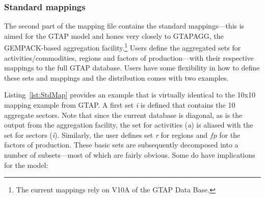 \subsubsection{Standard mappings}

The second part of the mapping file contains the standard mappings---this is
aimed for the GTAP model and hones very closely to GTAPAGG, the GEMPACK-based
aggregation facility.\footnote{The current mappings rely
on V10A of the GTAP Data Base.}
Users define the aggregated sets for
activities/commodities, regions and factors of production---with their
respective mappings to the full GTAP database. Users have some flexibility in
how to define these sets and mappings and the distribution comes with two
examples.

Listing~\ref{lst:StdMap} provides an example that is virtually identical to the
10x10 mapping example from GTAP. A first set \emph{i} is defined that contains
the 10 aggregate sectors. Note that since the current database is diagonal, as
is the output from the aggregation facility, the set for activities (\emph{a})
is aliased with the set for sectors (\emph{i}). Similarly, the user defines set
\emph{r} for regions and $\mathit{fp}$ for the factors of production. These
basic sets are subsequently decomposed into a number of subsets---most of which
are fairly obvious. Some do have implications for the model:

